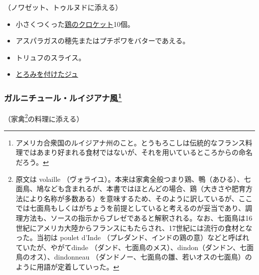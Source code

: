 \begin{recette}


（ノワゼット、トゥルヌドに添える）

\begin{itemize}
\item
  小さくつくった\protect\hyperlink{croquettes-de-volaille}{鶏のクロケット}10個。
\item
  アスパラガスの穂先またはプチポワをバターであえる。
\item
  トリュフのスライス。
\item
  \protect\hyperlink{jus-de-veau-lie}{とろみを付けたジュ}
\end{itemize}

\hypertarget{garniture-louisiane}{%
\subsubsection[ガルニチュール・ルイジアナ風]{\texorpdfstring{ガルニチュール・ルイジアナ風\footnote{アメリカ合衆国のルイジアナ州のこと。とうもろこしは伝統的なフランス料理ではあまり好まれる食材ではないが、それを用いているところからの命名だろう。}}{ガルニチュール・ルイジアナ風}}\label{garniture-louisiane}}



（家禽\footnote{原文は volaille
  （ヴォライユ）。本来は家禽全般つまり鶏、鴨（あひる）、七面鳥、鳩なども含まれるが、本書ではほとんどの場合、鶏（大きさや肥育方法により名称が多数ある）を意味するため、そのように訳しているが、ここでは七面鳥もしくはがちょうを前提としていると考えるのが妥当であり、調理方法も、ソースの指示からブレゼであると解釈される。なお、七面鳥は16世紀にアメリカ大陸からフランスにもたらされ、17世紀には流行の食材となった。当初は
  poulet d'Inde
  （プレダンド、インドの鶏の意）などと呼ばれていたが、やがてdinde
  （ダンド、七面鳥のメス）、dindon（ダンドン、七面鳥のオス）、dindonneau
  （ダンドノー、七面鳥の雛、若いオスの七面鳥）のように用語が定着していった。}の料理に添える）


\end{recette}
